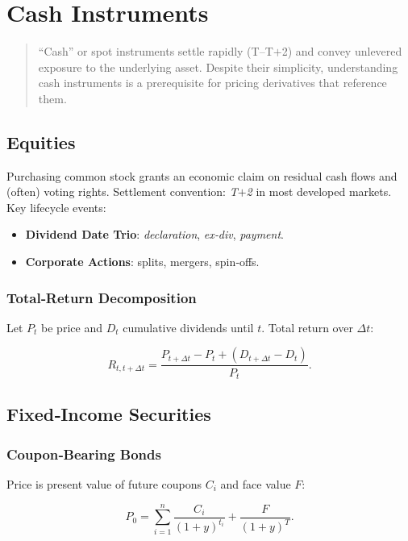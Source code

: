\chapter{Cash Instruments}\label{ch:cash}

\begin{abstract}
“Cash” or spot instruments settle rapidly (T\0–T\(+\)2) and convey
unlevered exposure to the underlying asset.  
Despite their simplicity, understanding cash instruments is a prerequisite for
pricing derivatives that reference them.
\end{abstract}

\section{Equities}

Purchasing common stock grants an economic claim on residual cash flows
and (often) voting rights.  Settlement convention: \emph{T\(+\)2} in most
developed markets.  Key lifecycle events:

\begin{itemize}
  \item \textbf{Dividend Date Trio}: \emph{declaration}, \emph{ex‑div}, \emph{payment}.
  \item \textbf{Corporate Actions}: splits, mergers, spin‑offs.
\end{itemize}

\subsection{Total‑Return Decomposition}

Let \(P_t\) be price and \(D_t\) cumulative dividends until \(t\).  
Total return over \(\Delta t\):

\[
R_{t,t+\Delta t} = \frac{P_{t+\Delta t}-P_t + (D_{t+\Delta t}-D_t)}{P_t}.
\]

\section{Fixed‑Income Securities}

\subsection{Coupon‑Bearing Bonds}

Price is present value of future coupons \(C_i\) and face value \(F\):

\[
P_0 = \sum_{i=1}^{n} \frac{C_i}{(1+y)^{t_i}} + \frac{F}{(1+y)^{T}} .
\]

